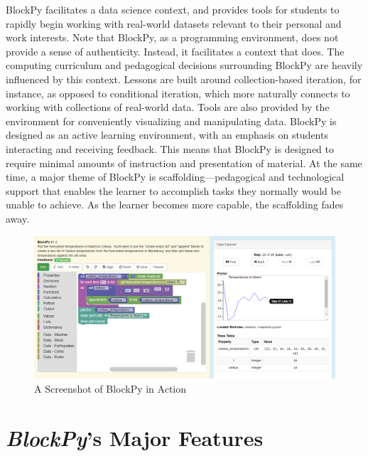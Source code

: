 \documentclass[10pt,journal,compsoc]{IEEEtran}
\begin{document}
BlockPy facilitates a data science context, and provides tools for students to rapidly begin working with real-world datasets relevant to their personal and work interests.
Note that BlockPy, as a programming environment, does not provide a sense of authenticity.
Instead, it facilitates a context that does.
The computing curriculum and pedagogical decisions surrounding BlockPy are heavily influenced by this context.
Lessons are built around collection-based iteration, for instance, as opposed to conditional iteration, which more naturally connects to working with collections of real-world data.
Tools are also provided by the environment for conveniently visualizing and manipulating data.
BlockPy is designed as an active learning environment, with an emphasis on students interacting and receiving feedback.
This means that BlockPy is designed to require minimal amounts of instruction and presentation of material.
At the same time, a major theme of BlockPy is scaffolding---pedagogical and technological support that enables the learner to accomplish tasks they normally would be unable to achieve.
As the learner becomes more capable, the scaffolding  fades away.

\begin{figure}[h]
\centering
\includegraphics[width=\textwidth]{images/blockpy-screenshot}
\vspace{-\medskipamount}
\vspace{-\bigskipamount}
\caption{A Screenshot of BlockPy in Action}
\label{fig:blockpy-screenshot}
\vspace{-\medskipamount}
\end{figure}


\section{\textit{BlockPy}'s Major Features}
\end{document}
